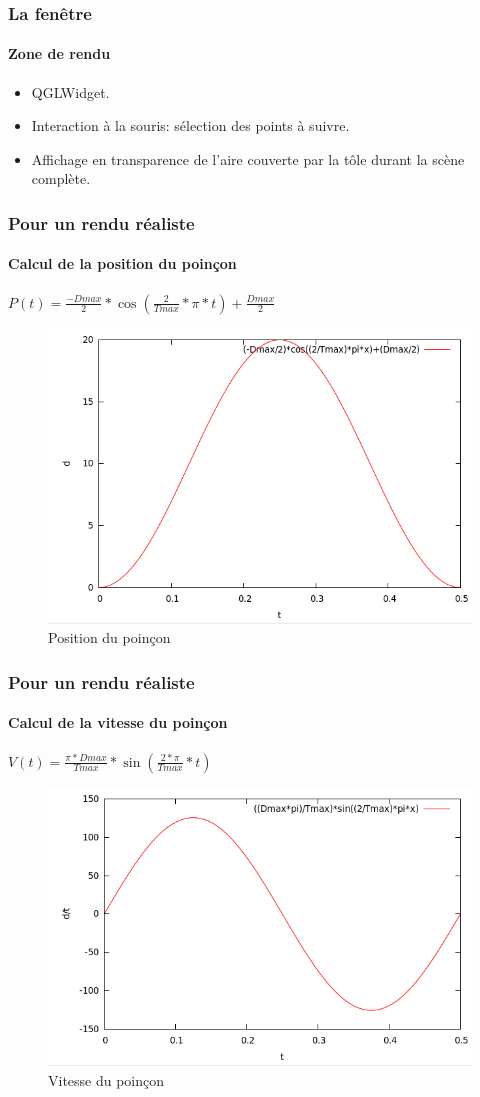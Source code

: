 \documentclass{beamer}
\begin{document}
\begin{frame}
    \frametitle{La fenêtre}
    \framesubtitle{Zone de rendu}
    \begin{itemize}
        \item QGLWidget.
        \item Interaction à la souris: sélection des points à suivre.
        \item Affichage en transparence de l'aire couverte par la tôle durant la scène complète.
    \end{itemize}
\end{frame}
\begin{frame}
    \frametitle{Pour un rendu réaliste}
    \framesubtitle{Calcul de la position du poinçon}
    \begin{center}
        $P(t) = \frac{-Dmax}{2}*\cos(\frac{2}{Tmax}*\pi*t)+\frac{Dmax}{2}$
    \end{center}
    \begin{figure}
        \includegraphics[width=.7\textwidth]{img/position.png}
        \caption{Position du poinçon}
        \label{Position}
    \end{figure}
\end{frame}
\begin{frame}
    \frametitle{Pour un rendu réaliste}
    \framesubtitle{Calcul de la vitesse du poinçon}
    \begin{center}
        $V(t) = \frac{\pi*Dmax}{Tmax}*\sin(\frac{2*\pi}{Tmax}*t)$
    \end{center}
    \begin{figure}
        \includegraphics[width=.7\textwidth]{img/vitesse.png}
        \caption{Vitesse du poinçon}
        \label{Vitesse}
    \end{figure}
\end{frame}
\end{document}
